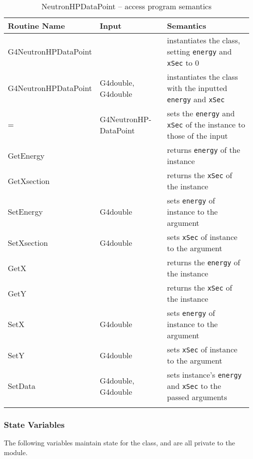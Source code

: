 \documentclass[12pt]{article}
\begin{document}
\begin{table}[H]
\caption{NeutronHPDataPoint -- access program semantics}\label{Table_NeutronHPDataPointSemantics}
\begin{tabular}{l p{} p{}}
\toprule
\bf Routine Name & \bf Input & \bf Semantics \\ \midrule
\arrayrulecolor{lightgray}
G4NeutronHPDataPoint  &                      & instantiates the class, setting \texttt{energy} and \texttt{xSec} to 0\\\hline
G4NeutronHPDataPoint  & G4double, G4double   & instantiates the class with the inputted \texttt{energy} and \texttt{xSec}\\\hline
=                     & G4NeutronHP-DataPoint& sets the \texttt{energy} and \texttt{xSec} of the instance to those of the input \\\hline
GetEnergy             &                      & returns \texttt{energy} of the instance \\\hline
GetXsection           &                      & returns the \texttt{xSec} of the instance\\\hline
SetEnergy             & G4double             & sets \texttt{energy} of instance to the argument\\\hline
SetXsection           & G4double             & sets \texttt{xSec} of instance to the argument\\\hline
GetX                  &                      & returns the \texttt{energy} of the instance\\\hline
GetY 				  &                      & returns the \texttt{xSec} of the instance\\\hline
SetX				  & G4double             & sets \texttt{energy} of instance to the argument\\\hline
SetY				  & G4double             & sets \texttt{xSec} of instance to the argument \\\hline
SetData				  & G4double, G4double   & sets instance's \texttt{energy} and \texttt{xSec} to the passed arguments\\
\arrayrulecolor{black}
\bottomrule
\end{tabular}
\end{table}

\subsubsection{State Variables}%
The following variables maintain state for the class, and are all private to the module.
\end{document}
